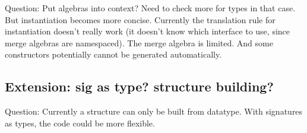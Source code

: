 \documentclass[a4paper]{article}
\begin{document}
Question: Put algebras into context? Need to check more for types in that case. But instantiation becomes more concise. Currently the translation rule for instantiation doesn't really work (it doesn't know which interface to use, since merge algebras are namespaced). The merge algebra is limited. And some constructors potentially cannot be generated automatically.

\subsection{Extension: sig as type? structure building?}

Question: Currently a structure can only be built from datatype. With signatures as types, the code could be more flexible.
\end{document}
